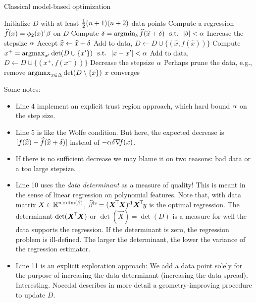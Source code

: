 \begin{algorithm}
\caption{Classical model-based optimization}\label{algoModelBasedOpt}
\begin{algorithmic}[1]
\State Initialize $D$ with at least $\frac{1}{2} (n+1)(n+2)$ data points
\Repeat
\State Compute a regression $\widehat f(x) = \phi_2(x)^{\!\top\!}\beta$ on $D$
\State Compute $\delta = \operatorname*{argmin}_\delta \widehat f(\widehat x+\delta) ~~\text{s.t.}~~ |\delta|<\alpha$
 
\State Increase the stepsize $\alpha$
\State Accept $\widehat x \gets \widehat x + \delta$
\State Add to data, $D \gets D \cup \{(\hat x,f(\hat x))\}$
\Else {}
 
\State Compute $x^+ = \operatorname*{argmax}_{x'} \det(D\cup\{x'\}) ~~\text{s.t.}~~ |x-x'|<\alpha$
\State Add to data, $D \gets D \cup \{(x^+,f(x^+))\}$
\Else {}
\State Decrease the stepsize $\alpha$
\EndIf
\EndIf
\State Perhaps prune the data, e.g., remove $\operatorname*{argmax}_{x\in\Delta} \det(D\setminus\{x\})$
\Until $x$ converges
\end{algorithmic}
\end{algorithm}

Some notes:
\begin{itemize}
\item Line 4 implement an explicit trust region approach, which hard
bound $\alpha$ on the step size.
\item Line 5 is like the Wolfe condition. But here, the expected
decrease is $[f(\widehat x)-\widehat f(\widehat x+\delta)]$ instead of $-\alpha\delta{\nabla_{\!\!}}
f(x)$.
\item If there is no sufficient decrease we may blame it on two
reasons: bad data or a too large stepsize.
\item Line 10 uses the \emph{data determinant} as a measure of
quality! This is meant in the sense of linear regression on polynomial
features. Note that, with data matrix $X\in{\mathbb{R}}^{n\times\dim(\beta)}$,
$\widehat {\beta}^{\text{ls}} = (\boldsymbol X^{\!\top\!} \boldsymbol X)^{{\hspace*{-.0pt}\text{\rm -}\hspace*{-.5pt}}1} \boldsymbol X^{\!\top\!} y$ is the
optimal regression. The determinant $\det (\boldsymbol X^{\!\top\!} \boldsymbol X)$ or
$\det(\vec X)=\det(D)$ is a measure for well the data supports the
regression. If the determinant is zero, the regression problem is
ill-defined. The larger the determinant, the lower the variance of the
regression estimator.

\item Line 11 is an explicit exploration approach: We add a data point
solely for the purpose of increasing the data determinant (increasing
the data spread). Interesting.  Nocedal describes in more detail a
geometry-improving procedure to update $D$.
\end{itemize}

